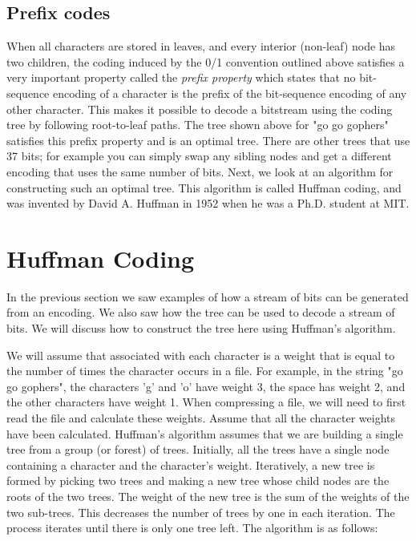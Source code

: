 \documentclass[11pt]{article}
\begin{document}
\subsection{Prefix codes}
 
When all characters are stored in leaves, and every interior
(non-leaf) node has two children, the coding induced by the 0/1
convention outlined above satisfies a very important property called
the \textit{prefix property} which states that no bit-sequence
encoding of a character is the prefix of the bit-sequence encoding of
any other character.  This makes it possible to decode a bitstream
using the coding tree by following root-to-leaf paths.  The tree shown
above for "go go gophers" satisfies this prefix property and is an
optimal tree.  There are other trees that use 37 bits; for example you
can simply swap any sibling nodes and get a different encoding that
uses the same number of bits.  Next, we look at an algorithm for
constructing such an optimal tree.  This algorithm is called Huffman
coding, and was invented by David A. Huffman in 1952 when he was a
Ph.D. student at MIT.

\section{Huffman Coding}

In the previous section we saw examples of how a stream of bits can be
generated from an encoding.  We also saw how the tree can be used to
decode a stream of bits.  We will discuss how to construct the tree
here using Huffman's algorithm.

We will assume that associated with each character is a weight that is
equal to the number of times the character occurs in a file.  For
example, in the string "go go gophers", the characters 'g' and 'o'
have weight 3, the space has weight 2, and the other characters have
weight 1.  When compressing a file, we will need to first read the
file and calculate these weights.  Assume that all the character
weights have been calculated.  Huffman's algorithm assumes that we are
building a single tree from a group (or forest) of trees.  Initially,
all the trees have a single node containing a character and the
character's weight.  Iteratively, a new tree is formed by picking two
trees and making a new tree whose child nodes are the roots of the two
trees.  The weight of the new tree is the sum of the weights of the
two sub-trees.  This decreases the number of trees by one in each
iteration.  The process iterates until there is only one tree
left. The algorithm is as follows:
\end{document}
